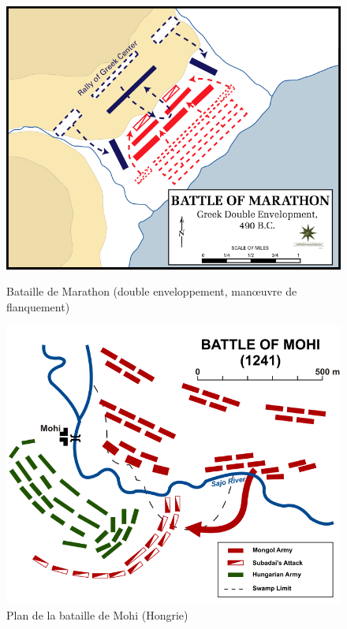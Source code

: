 \documentclass{article}
\begin{document}
\begin{center}
\begin{figure}[H]
\hfill
\begin{minipage}[H]{0.5\linewidth}
	\centering
	\includegraphics[width=\linewidth]{../ressources/Battle_of_Marathon}
	\caption{Bataille de Marathon (double enveloppement, manœuvre de flanquement) \cite{flanking_maneuver}}
\end{minipage}
\hfill
\begin{minipage}[H]{0.45\linewidth}
	\centering
	\includegraphics[width=\linewidth]{../ressources/Battle_of_Mohi}
	\caption{Plan de la bataille de Mohi (Hongrie) \cite{mohi_battle}}
\end{minipage}
\hfill
\end{figure}
\cite{tactic,pincer_tactic}
\end{center}
\end{document}
